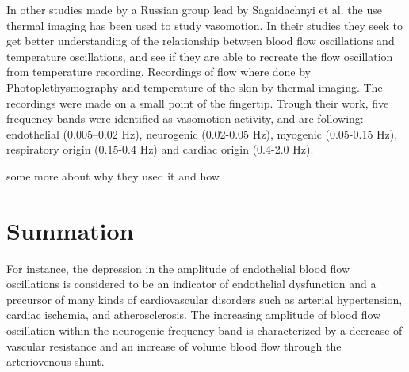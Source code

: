 In other studies made by a Russian group lead by Sagaidachnyi et al. the use thermal imaging has been used to study vasomotion. In their studies they seek to get better understanding of the relationship between blood flow oscillations and temperature oscillations, and see if they are able to recreate the flow oscillation from temperature recording. Recordings of flow where done by Photoplethysmography and temperature of the skin by thermal imaging. The recordings were made on a small point of the fingertip. Trough their work, five frequency bands were identified as vasomotion activity, and are following: endothelial (0.005–0.02 Hz), neurogenic (0.02-0.05 Hz), myogenic (0.05-0.15 Hz), respiratory origin (0.15-0.4 Hz) and cardiac origin (0.4-2.0 Hz).\cite{sagaidachnyi2017,sagaidachnyi2014}

some more about why they used it and how

\section{Summation}


For instance, the depression in the amplitude of endothelial blood flow oscillations is considered to be an indicator of endothelial dysfunction and a precursor of many kinds of cardiovascular disorders
such as arterial hypertension, cardiac ischemia, and atherosclerosis. The increasing amplitude of blood flow oscillation within the neurogenic frequency band is characterized by a decrease
of vascular resistance and an increase of volume blood flow through the arteriovenous shunt.